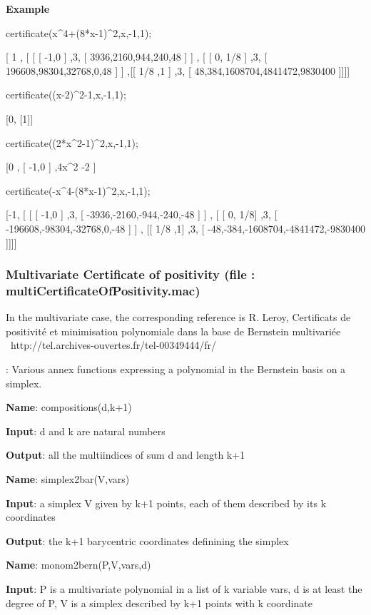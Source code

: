 \documentclass{article}
\begin{document}
  {\bf Example} 
  
  certificate(x\^{}4+(8*x-1)\^{}2,x,-1,1);
  
  [ 1 , [ [ [ -1,0 ] ,3, [ 3936,2160,944,240,48 ] ] , [ [ 0, 1/8 ] ,3, [
    196608,98304,32768,0,48 ] ] ,[[ 1/8 ,1 ]
    ,3, [ 48,384,1608704,4841472,9830400 ]]]]
    
    certificate((x-2)\^{}2-1,x,-1,1);
    
    [0, [1]]
    
  certificate((2*x\^{}2-1)\^{}2,x,-1,1);
  
  [0 , [ -1,0 ] ,4x\^{}{2} -2 ]
   
   
  certificate(-x\^{}4-(8*x-1)\^{}2,x,-1,1);
    
   [-1, [ [ [ -1,0 ] ,3, [
    -3936,-2160,-944,-240,-48 ] ] , [ [ 0, 1/8] ,3, [
    -196608,-98304,-32768,0,-48 ] ] , [[ 1/8 ,1] ,3, 
    [ -48,-384,-1608704,-4841472,-9830400 ]]]]


\subsubsection{Multivariate Certificate of positivity (file : multiCertificateOfPositivity.mac)}

 In the multivariate case, the corresponding reference is R. Leroy,
Certificats de positivit{\'e} et minimisation polynomiale dans la base de
Bernstein multivari{\'e}e \ http://tel.archives-ouvertes.fr/tel-00349444/fr/


:
  Various annex functions expressing a polynomial in the Bernstein basis on a
  simplex.
  
{\bf Name}: compositions(d,k+1)
  
{\bf  Input}: d and k are natural numbers
  
{\bf Output}: all the multiindices of sum d and length k+1
  
 {\bf Name}: simplex2bar(V,vars)
  
  {\bf Input}: a simplex V given by k+1 points, each of them described by its k
  coordinates
  
  {\bf Output}: the k+1 barycentric coordinates definining the simplex
  
  
  {\bf Name}: monom2bern(P,V,vars,d)
  
   {\bf Input}: P is a multivariate polynomial in a list of k variable vars, d is at
  least the degree of P, V is a simplex described by k+1 points with k
  coordinate
  
\end{document}
